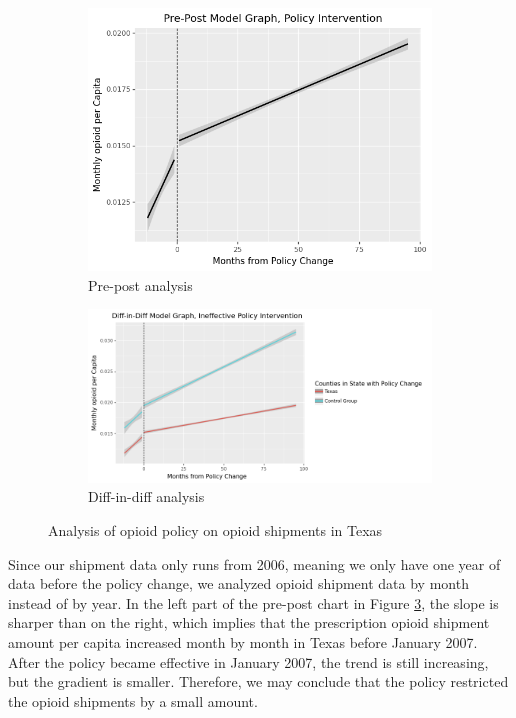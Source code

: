 \documentclass[12pt,letterpaper]{article}
\begin{document}
\begin{figure}[!h]
\centering
\begin{subfigure}{.5\textwidth}
  \centering
  \includegraphics[width=0.7\linewidth]{../30_results/Bonus_Results/texas_opioid_shipment_prepost_monthly.png}
  \caption{Pre-post analysis}
  \label{fig:tx_ship_prepost}
\end{subfigure}%
\begin{subfigure}{.55\textwidth}
  \centering
  \includegraphics[width=1\linewidth]{../30_results/Bonus_Results/texas_opioid_shipment_diffdiff_monthly.png}
  \caption{Diff-in-diff analysis}
  \label{fig:tx_ship_did}
\end{subfigure}
\caption{Analysis of opioid policy on opioid shipments in Texas}
\label{fig:tx_ship}
\end{figure}
Since our shipment data only runs from 2006, meaning we only have one year of data before the policy change, we analyzed opioid shipment data by month instead of by year. In the left part of the pre-post chart in Figure \ref{fig:tx_ship}, the slope is sharper than on the right, which implies that the prescription opioid shipment amount per capita increased month by month in Texas before January 2007. After the policy became effective in January 2007, the trend is still increasing, but the gradient is smaller. Therefore, we may conclude that the policy restricted the opioid shipments by a small amount.
\end{document}
